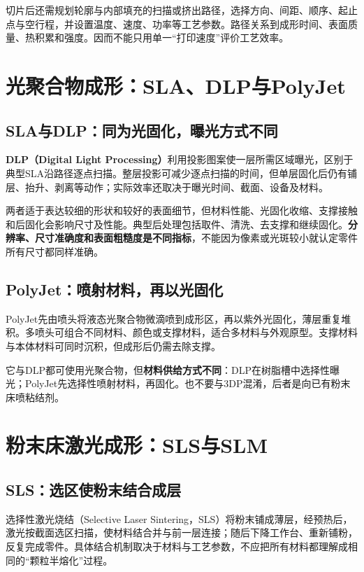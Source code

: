 切片后还需规划轮廓与内部填充的扫描或挤出路径，选择方向、间距、顺序、起止点与空行程，并设置温度、速度、功率等工艺参数。路径关系到成形时间、表面质量、热积累和强度。因而不能只用单一“打印速度”评价工艺效率。

\section{光聚合物成形：SLA、DLP与PolyJet}
\subsection{SLA与DLP：同为光固化，曝光方式不同}

\textbf{DLP（Digital Light Processing）}利用投影图案使一层所需区域曝光，区别于典型SLA沿路径逐点扫描。整层投影可减少逐点扫描的时间，但单层固化后仍有铺层、抬升、剥离等动作；实际效率还取决于曝光时间、截面、设备及材料。

两者适于表达较细的形状和较好的表面细节，但材料性能、光固化收缩、支撑接触和后固化会影响尺寸及性能。典型后处理包括取件、清洗、去支撑和继续固化。\textbf{分辨率、尺寸准确度和表面粗糙度是不同指标}，不能因为像素或光斑较小就认定零件所有尺寸都同样准确。

\subsection{PolyJet：喷射材料，再以光固化}
PolyJet先由喷头将液态光聚合物微滴喷到成形区，再以紫外光固化，薄层重复堆积。多喷头可组合不同材料、颜色或支撑材料，适合多材料与外观原型。支撑材料与本体材料可同时沉积，但成形后仍需去除支撑。

它与DLP都可使用光聚合物，但\textbf{材料供给方式不同}：DLP在树脂槽中选择性曝光；PolyJet先选择性喷射材料，再固化。也不要与3DP混淆，后者是向已有粉末床喷粘结剂。

\section{粉末床激光成形：SLS与SLM}
\subsection{SLS：选区使粉末结合成层}
选择性激光烧结（Selective Laser Sintering，SLS）将粉末铺成薄层，经预热后，激光按截面选区扫描，使材料结合并与前一层连接；随后下降工作台、重新铺粉，反复完成零件。具体结合机制取决于材料与工艺参数，不应把所有材料都理解成相同的“颗粒半熔化”过程。

